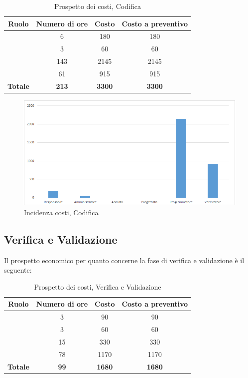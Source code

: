 \begin{table}[H]
	\begin{center}
		\begin{tabular}{|c|c|c|c|}
			\hline
			\textbf{Ruolo}	& \textbf{Numero di ore} & \textbf{Costo} & \textbf{Costo a preventivo}\\
			\hline
			\Res	&	6  &	180  &	180	\\
			\hline
			\Amm	&	3  &	60  &	60	\\
			\hline
			\Progr	&	143  &	2145  &	2145	\\
			\hline
			\Ver	&	61  &	915  &	915		\\
			\hline
			\textbf{Totale}  &	\textbf{213} &	\textbf{3300} &	\textbf{3300}	\\
			\hline
		\end{tabular}
	\end{center}
	\caption{Prospetto dei costi, Codifica }
\end{table}

\begin{figure}[H]
	\centering
	\includegraphics[scale=0.6]{img/8-4.png}
	\caption{Incidenza costi, Codifica}
\end{figure}

\newpage
\subsection{Verifica e Validazione}
Il prospetto economico per quanto concerne la fase di verifica e validazione è il seguente:


\begin{table}[H]
	\begin{center}
		\begin{tabular}{|c|c|c|c|}
			\hline
			\textbf{Ruolo}	& \textbf{Numero di ore} & \textbf{Costo} & \textbf{Costo a preventivo}\\
			\hline
			\Res	&	3  &	90  &	90	\\
			\hline
			\Amm	&	3  &	60  &	60	\\
			\hline
			\Prog	&	15  &	330  &	330	\\
			\hline
			\Ver	&	78  &	1170  &	1170	\\
			\hline
			\textbf{Totale}  &	\textbf{99}  &	\textbf{1680}  &	\textbf{1680}	\\
			\hline
		\end{tabular}
	\end{center}
	\caption{Prospetto dei costi, Verifica e Validazione}
\end{table}

